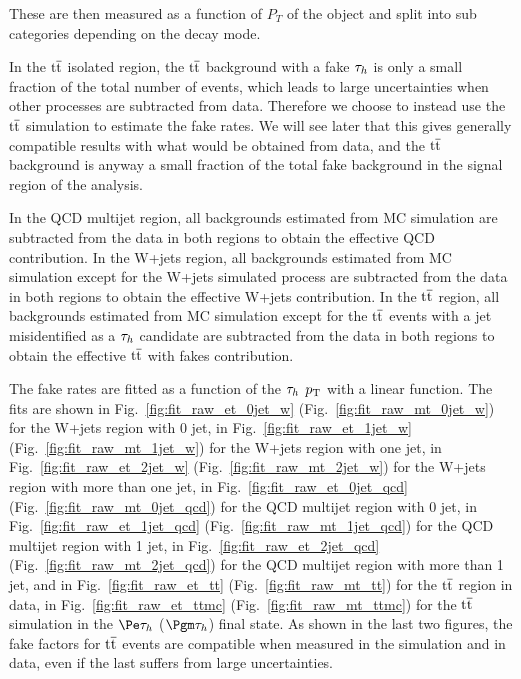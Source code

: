These are then measured as a function of $P_T$ of the object and split into sub categories depending on the decay mode.  



In the $\mathrm{t}\overline{\mathrm{t}}$ isolated region, the $\mathrm{t}\overline{\mathrm{t}}$ background with a fake $\tau_h$ is only a small fraction of the total number of events, which leads to large uncertainties when other processes are subtracted from data. Therefore we choose to instead use the $\mathrm{t}\overline{\mathrm{t}}$ simulation to estimate the fake rates. We will see later that this gives generally compatible results with what would be obtained from data, and the $\mathrm{t}\overline{\mathrm{t}}$ background is anyway a small fraction of the total fake background in the signal region of the analysis.

  In the QCD multijet region, all backgrounds estimated from MC simulation are subtracted from the data in both regions to obtain the
effective QCD contribution. In the W+jets region, all backgrounds estimated from MC simulation except for the
W+jets simulated process are subtracted from the data in both regions to obtain the effective W+jets contribution.
In the $\mathrm{t}\overline{\mathrm{t}}$ region, all backgrounds estimated from MC simulation except for the $\mathrm{t}\overline{\mathrm{t}}$ events with a
jet misidentified as a $\tau_h$ candidate are subtracted from the data in both regions to obtain the effective $\mathrm{t}\overline{\mathrm{t}}$ with fakes contribution.

The fake rates are fitted as a function of the $\tau_h$ $p_{\mathrm{T}}$ with a linear function. The fits are shown in Fig.~\ref{fig:fit_raw_et_0jet_w} (Fig.~\ref{fig:fit_raw_mt_0jet_w}) for the W+jets region with 0 jet, 
in Fig.~\ref{fig:fit_raw_et_1jet_w} (Fig.~\ref{fig:fit_raw_mt_1jet_w}) for the W+jets region with  
one jet, in Fig.~\ref{fig:fit_raw_et_2jet_w} (Fig.~\ref{fig:fit_raw_mt_2jet_w}) for the W+jets region with         
more than one jet, in Fig.~\ref{fig:fit_raw_et_0jet_qcd} (Fig.~\ref{fig:fit_raw_mt_0jet_qcd}) 
for the QCD multijet region with 0 jet, in Fig.~\ref{fig:fit_raw_et_1jet_qcd} (Fig.~\ref{fig:fit_raw_mt_1jet_qcd}) 
for the QCD multijet region with 1 jet, 
in Fig.~\ref{fig:fit_raw_et_2jet_qcd} (Fig.~\ref{fig:fit_raw_mt_2jet_qcd})
for the QCD multijet region with more than 1 jet,
and in Fig.~\ref{fig:fit_raw_et_tt} (Fig.~\ref{fig:fit_raw_mt_tt}) 
for the $\mathrm{t}\overline{\mathrm{t}}$ region in data, in Fig.~\ref{fig:fit_raw_et_ttmc} (Fig.~\ref{fig:fit_raw_mt_ttmc}) 
for the $\mathrm{t}\overline{\mathrm{t}}$ simulation in the $\Pe\tauh$ ($\Pgm\tauh$) final state. As shown in the last two figures, the fake factors for $\mathrm{t}\overline{\mathrm{t}}$ events are compatible when measured in the simulation and in data, even if the last suffers from large uncertainties. 


